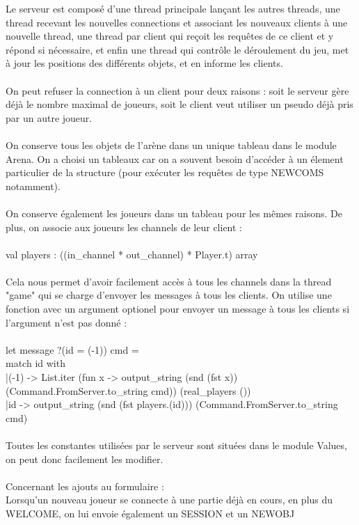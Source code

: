 \documentclass{article}
\begin{document}
Le serveur est composé d'une thread principale lançant les autres threads, une thread recevant les nouvelles connections et
associant les nouveaux clients à une nouvelle thread, une thread par client qui reçoit les requêtes de ce client et y répond si nécessaire,
et enfin une thread qui contrôle le déroulement du jeu, met à jour les positions des différents objets, et en informe les clients.\\
\\
On peut refuser la connection à un client pour deux raisons : soit le serveur gère déjà le nombre maximal de joueurs, soit le client veut utiliser un
pseudo déjà pris par un autre joueur.\\
\\
On conserve tous les objets de l'arène dans un unique tableau dans le module Arena. On a choisi un tableaux car on a souvent besoin d'accéder à un
élement particulier de la structure (pour exécuter les requêtes de type NEWCOMS notamment).\\
\\
On conserve également les joueurs dans un tableau pour les mêmes raisons. De plus, on associe aux joueurs les channels de leur client :\\
\\
val players : ((in\_channel * out\_channel) * Player.t) array\\
\\
Cela nous permet d'avoir facilement accès à tous les channels dans la thread "game" qui se charge d'envoyer les messages à tous les clients.
On utilise une fonction avec un argument optionel pour envoyer un message à tous les clients si l'argument n'est pas donné :\\
\\
let message ?(id = (-1)) cmd =\\
  match id with\\
  |(-1) -> List.iter (fun x -> output\_string (snd (fst x)) (Command.FromServer.to\_string cmd)) (real\_players ())\\
  |id -> output\_string (snd (fst players.(id))) (Command.FromServer.to\_string cmd)\\
\\
Toutes les constantes utilisées par le serveur sont situées dans le module Values, on peut donc facilement les modifier.\\
\\
Concernant les ajouts au formulaire :\\
Lorsqu'un nouveau joueur se connecte à une partie déjà en cours, en plus du WELCOME, on lui envoie également un SESSION et un NEWOBJ
\end{document}
